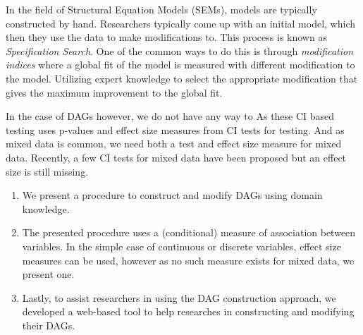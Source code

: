 \documentclass{article}
\begin{document}
In the field of Structural Equation Models (SEMs), models are typically
constructed by hand. Researchers typically come up with an initial model, which
then they use the data to make modifications to. This process is known as
\emph{Specification Search}. One of the common ways to do this is through
\emph{modification indices} where a global fit of the model is measured with
different modification to the model. Utilizing expert knowledge to select the
appropriate modification that gives the maximum improvement to the global fit.

In the case of DAGs however, we do not have any way to As these CI based
testing uses p-values and effect size measures from CI tests for testing. And
as mixed data is common, we need both a test and effect size measure for mixed
data. Recently, a few CI tests for mixed data have been proposed but an effect
size is still missing.

\begin{enumerate}
	\item We present a procedure to construct and modify DAGs using domain
		knowledge.
	\item The presented procedure uses a (conditional) measure of
		association between variables. In the simple case of continuous
		or discrete variables, effect size measures can be used,
		however as no such measure exists for mixed data, we present
		one.
	\item Lastly, to assist researchers in using the DAG construction
		approach, we developed a web-based tool to help researches in
		constructing and modifying their DAGs.
\end{enumerate}
\end{document}
